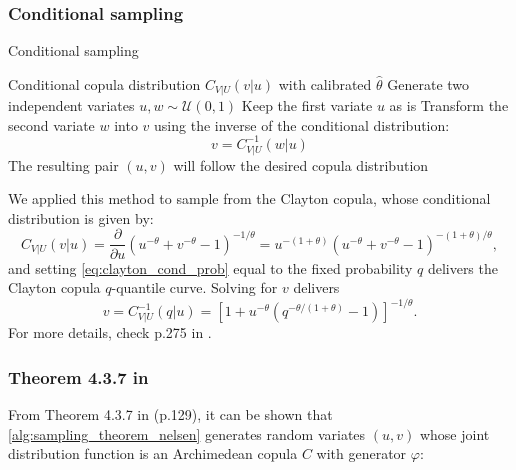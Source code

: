 \documentclass[12pt,a4paper]{article}
\begin{document}
\subsubsection{Conditional sampling}

\begin{algorithm}[H]
\caption{Conditional sampling}
\begin{algorithmic}[1]
\Require Conditional copula distribution $C_{V|U}(v|u)$ with calibrated $\hat \theta$
\State Generate two independent variates $u,w\sim \mathcal U(0,1)$
\State Keep the first variate $u$ as is
\State Transform the second variate $w$ into $v$ using the inverse of the conditional distribution:
$$v = C^{-1}_{V|U}(w|u)$$
\Ensure The resulting pair $(u,v)$ will follow the desired copula distribution
\end{algorithmic}
\end{algorithm}

We applied this method to sample from the Clayton copula, whose conditional distribution is given by:
\begin{equation}\label{eq:clayton_cond_prob}
	C_{V|U}(v|u)= \frac{\partial}{\partial u} (u^{-\theta}+v^{-\theta} - 1)^{-1/\theta} = u^{-(1+\theta)}(u^{-\theta}+v^{-\theta} - 1)^{-(1+\theta)/\theta},
\end{equation}
and setting \eqref{eq:clayton_cond_prob} equal to the fixed probability $q$ delivers the Clayton copula $q$-quantile curve. Solving for $v$ delivers%
$$v = C_{V|U}^{-1} (q|u)= \left[1+u^{-\theta}(q^{-\theta/(1+\theta)} - 1)\right]^{-1/\theta}.$$
For more details, check p.275 in \cite{alexander2008market}.



\subsubsection{Theorem 4.3.7 in \cite{Nelsen2006}}
From Theorem 4.3.7 in \cite{Nelsen2006} (p.129), it can be shown that \cref{alg:sampling_theorem_nelsen} generates random variates $(u,v)$ whose joint distribution function is an Archimedean copula $C$ with generator $\varphi$: %
\end{document}
